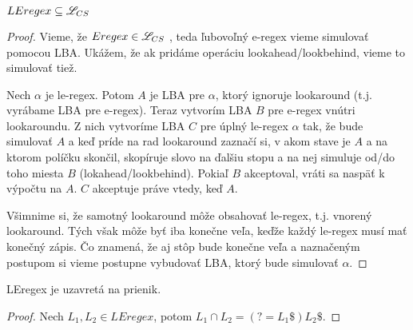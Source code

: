 \begin{veta}
$ LEregex \subseteq \mathscr{L}_{CS} $
\end{veta}
\begin{proof}
Vieme, že $ Eregex \in \mathscr{L}_{CS} $ \cite[Theorem 1]{ExtendedRegexPower}, teda ľubovoľný e-regex vieme simulovať pomocou LBA. Ukážem, že ak pridáme operáciu lookahead/lookbehind, vieme to simulovať tiež.

Nech $\alpha$ je le-regex. Potom $A$ je LBA pre $\alpha$, ktorý ignoruje lookaround (t.j. vyrábame LBA pre e-regex). Teraz vytvorím LBA $B$ pre e-regex vnútri lookaroundu. Z nich vytvoríme LBA $C$ pre úplný le-regex $\alpha$ tak, že bude simulovať $A$ a keď príde na rad lookaround zaznačí si, v akom stave je $A$ a na ktorom políčku skončil, skopíruje slovo na ďalšiu stopu a na nej simuluje od/do toho miesta $B$ (lokahead/lookbehind). Pokiaľ $B$ akceptoval, vráti sa naspäť k výpočtu na $A$. $C$ akceptuje práve vtedy, keď $A$.

Všimnime si, že samotný look\-a\-round môže obsahovať le-regex, t.j. vnorený lookaround. Tých však môže byť iba konečne veľa, keďže každý le-regex musí mať konečný zápis. Čo znamená, že aj stôp bude konečne veľa a naznačeným postupom si vieme postupne vybudovať LBA, ktorý bude simulovať $\alpha$.
\end{proof}

\begin{veta} \label{prienik}
LEregex je uzavretá na prienik.
\end{veta}
\begin{proof} 
Nech $L_1,L_2 \in LEregex$, potom $L_1 \cap L_2 = \left( ?= L_1 \mathdollar \right) L_2 \mathdollar $.
\end{proof}

